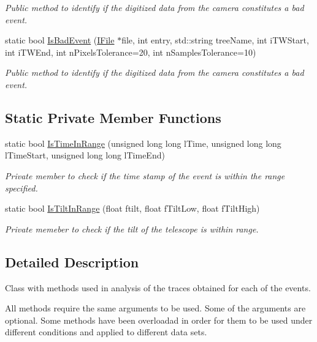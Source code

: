 \begin{DoxyCompactItemize}
\begin{DoxyCompactList}\small\item\em Public method to identify if the digitized data from the camera constitutes a bad event. \end{DoxyCompactList}\item 
static bool \hyperlink{classIHealthTools_a47f9868f08d011ff8f180a3b50116a11}{Is\+Bad\+Event} (\hyperlink{classIFile}{I\+File} $\ast$file, int entry, std\+::string tree\+Name, int i\+T\+W\+Start, int i\+T\+W\+End, int n\+Pixels\+Tolerance=20, int n\+Samples\+Tolerance=10)
\begin{DoxyCompactList}\small\item\em Public method to identify if the digitized data from the camera constitutes a bad event. \end{DoxyCompactList}\end{DoxyCompactItemize}
\subsection*{Static Private Member Functions}
\begin{DoxyCompactItemize}
\item 
static bool \hyperlink{classIHealthTools_ac3ac1d03cafa1046bf6ff6e591e30bb8}{Is\+Time\+In\+Range} (unsigned long long l\+Time, unsigned long long l\+Time\+Start, unsigned long long l\+Time\+End)
\begin{DoxyCompactList}\small\item\em Private member to check if the time stamp of the event is within the range specified. \end{DoxyCompactList}\item 
static bool \hyperlink{classIHealthTools_a0ece49def5b92e43a6f3630e42223dbd}{Is\+Tilt\+In\+Range} (float ftilt, float f\+Tilt\+Low, float f\+Tilt\+High)
\begin{DoxyCompactList}\small\item\em Private memeber to check if the tilt of the telescope is within range. \end{DoxyCompactList}\end{DoxyCompactItemize}


\subsection{Detailed Description}
Class with methods used in analysis of the traces obtained for each of the events. 

All methods require the same arguments to be used. Some of the arguments are optional. Some methods have been overloadad in order for them to be used under different conditions and applied to different data sets. 

